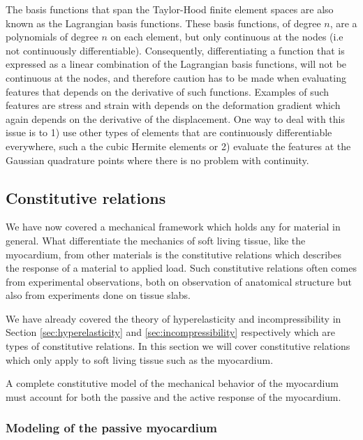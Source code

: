 \begin{remark}
  The basis functions that span the Taylor-Hood
  finite element spaces are also known as the
  Lagrangian basis functions. These basis functions, of
  degree $n$, are a polynomials of degree $n$ on each element, but only
  continuous at the nodes (i.e not continuously
  differentiable). Consequently, differentiating a function that is
  expressed as a linear combination of the Lagrangian basis functions,
  will not be continuous at the nodes, and therefore caution has to
  be made when evaluating features that depends on the derivative of
  such functions. Examples of such features are stress and
  strain with depends on the deformation gradient which again depends
  on the derivative of the displacement. One way to deal with this
  issue is to 1) use other types of elements that are continuously
  differentiable everywhere,  such a the cubic Hermite elements or 2) evaluate the features at the
  Gaussian quadrature points where there is no problem with continuity.
\end{remark}


\subsection{Constitutive relations}
\label{sec:constitutive_relations}
We have now covered a mechanical framework which holds any for
material in general. What differentiate the mechanics of soft
living tissue, like the myocardium, from other materials is the
constitutive relations which describes the response of a material to
applied load. Such constitutive relations often comes from
experimental observations, both on observation of anatomical structure
but also from experiments done on tissue slabs.

We have already covered the theory of hyperelasticity and incompressibility in Section
\ref{sec:hyperelasticity} and \ref{sec:incompressibility} respectively
which are types of constitutive relations. In this section we will
cover constitutive relations which only apply to soft living tissue
such as the myocardium. 

A complete constitutive model of the mechanical behavior of the
myocardium must account for both the passive and the active response
of the myocardium.


\subsubsection{Modeling of the passive myocardium}

